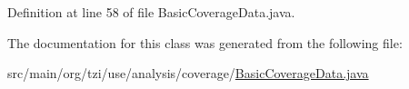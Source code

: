 Definition at line 58 of file Basic\-Coverage\-Data.\-java.



The documentation for this class was generated from the following file\-:\begin{DoxyCompactItemize}
\item 
src/main/org/tzi/use/analysis/coverage/\hyperlink{_basic_coverage_data_8java}{Basic\-Coverage\-Data.\-java}\end{DoxyCompactItemize}
